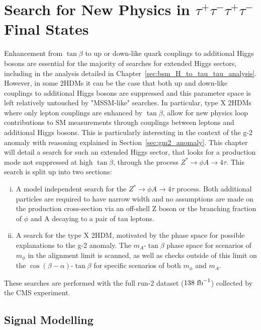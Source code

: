 \chapter{\texorpdfstring{Search for New Physics in $\tau^+\tau^-\tau^+\tau^-$ Final States}{Search for new physics in tautautautau final states}}
\label{sec:H_A_to_4_tau_analysis}

Enhancement from $\tan\beta$ to up or down-like quark couplings to additional Higgs bosons are essential for the majority of searches for extended Higgs sectors, including in the analysis detailed in Chapter~\ref{sec:bsm_H_to_tau_tau_analysis}.
However, in some 2HDMs it can be the case that both up and down-like couplings to additional Higgs bosons are suppressed and this parameter space is left relatively untouched by "MSSM-like" searches.
In particular, type X 2HDMs where only lepton couplings are enhanced by $\tan\beta$, allow for new physics loop contributions to SM measurements through couplings between leptons and additional Higgs bosons.
This is particularly interesting in the context of the g-2 anomaly \cite{} with reasoning explained in Section~\ref{sec:gm2_anomaly}.
This chapter will detail a search for such an extended Higgs sector, that looks for a production mode not suppressed at high $\tan\beta$, through the process $Z^{*}\rightarrow \phi A \rightarrow 4\tau$.
This search is split up into two sections:

\begin{enumerate}[i)]
  \item A model independent search for the $Z^{*}\rightarrow \phi A \rightarrow 4\tau$ process. Both additional particles are required to have narrow width and no assumptions are made on the production cross-section via an off-shell Z boson or the branching fraction of $\phi$ and A decaying to a pair of tau leptons.
   \item A search for the type X 2HDM, motivated by the phase space for possible explanations to the g-2 anomaly. The $m_{A}$-$\tan\beta$ phase space for scenarios of $m_\phi$ in the alignment limit is scanned, as well as checks outside of this limit on the $\cos(\beta-\alpha)$-$\tan\beta$ for specific scenarios of both $m_\phi$ and $m_A$.
\end{enumerate}

These searches are performed with the full run-2 dataset ($138 \text{ fb}^{-1}$) collected by the CMS experiment. 

\section{Signal Modelling}

